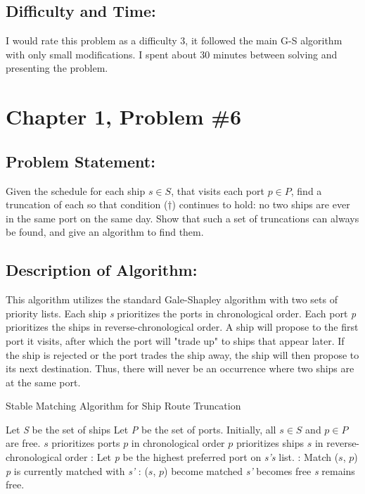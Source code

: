 \documentclass{article}
\begin{document}
\subsection*{Difficulty and Time:}
I would rate this problem as a difficulty 3, it followed the main G-S algorithm with only small modifications.  I spent about 30 minutes between solving and presenting the problem.

\newpage
\section*{Chapter 1, Problem \#6}
\subsection*{Problem Statement:}  Given the schedule for each ship $s \in S$, that visits each port $p \in P$, find a truncation of each so that condition ($\dag$) continues to hold:  no two ships are ever in the same port on the same day.  Show that such a set of truncations can always be found, and give an algorithm to find them.


\subsection*{Description of Algorithm:}
	This algorithm utilizes the standard Gale-Shapley algorithm with two sets of priority lists.  Each ship \textit{s} prioritizes the ports in chronological order.  Each port \textit{p} prioritizes the ships in reverse-chronological order.  A ship will propose to the first port it visits, after which the port will "trade up" to ships that appear later.  If the ship is rejected or the port trades the ship away, the ship will then propose to its next destination.  Thus, there will never be an occurrence where two ships are at the same port.

\begin{algorithm} %
\caption{Stable Matching Algorithm for Ship Route Truncation} %
\begin{algorithmic} %
    \State Let \textit{S} be the set of ships
    \State Let \textit{P} be the set of ports. 
	\State Initially, all $s \in S$ and $p \in P$ are free.
	\State $s$ prioritizes ports $p$ in chronological order
	\State $p$ prioritizes ships $s$ in reverse-chronological order
    :
    	\State Let \textit{p} be the highest preferred port on \textit{s's} list.
    	:
    		\State Match ($s$, $p$)
    	\Else
    		\Comment \textit{p} is currently matched with \textit{s'}
    		:
    			\State ($s$, $p$) become matched
    			\State \textit{s'} becomes free
    		\Else
    			 \State \textit{s} remains free.
    		\EndIf
    	\EndIf
	\EndWhile    
\end{algorithmic}
\end{algorithm}
\end{document}
